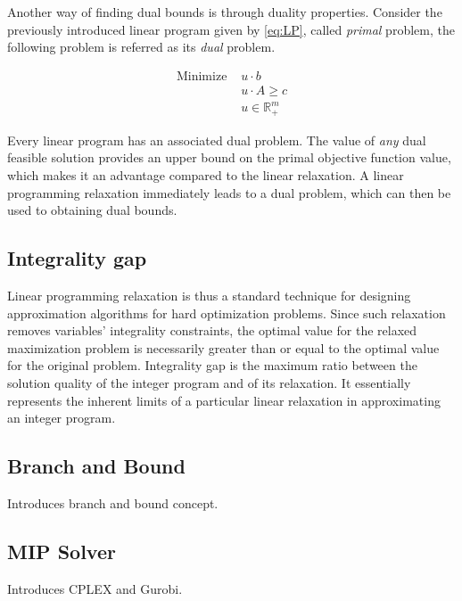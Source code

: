Another way of finding dual bounds is through duality properties. Consider the previously introduced linear program given by \eqref{eq:LP}, called \textit{primal} problem, the following problem is referred as its \textit{dual} problem.

\begin{subequations}
\label{eq:Dual}
\begin{align}
   \mbox{Minimize } & u \cdot b
								\\ & u \cdot A \ge c
								\\ & u \in \mathbb{R}^{m}_{+}
\end{align}
\end{subequations}

Every linear program has an associated dual problem. The value of \textit{any} dual feasible solution provides an upper bound on the primal objective function value, which makes it an advantage compared to the linear relaxation. A linear programming relaxation immediately leads to a dual problem, which can then be used to obtaining dual bounds.


\subsection{Integrality gap}

Linear programming relaxation is thus a standard technique for designing approximation algorithms for hard optimization problems. Since such relaxation removes variables' integrality constraints, the optimal value for the relaxed maximization problem is necessarily greater than or equal to the optimal value for the original problem. Integrality gap is the maximum ratio between the solution quality of the integer program and of its relaxation. It essentially represents the inherent limits of a particular linear relaxation in approximating an integer program.


\subsection{Branch and Bound}

Introduces branch and bound concept.


\subsection{MIP Solver}

Introduces CPLEX and Gurobi.


